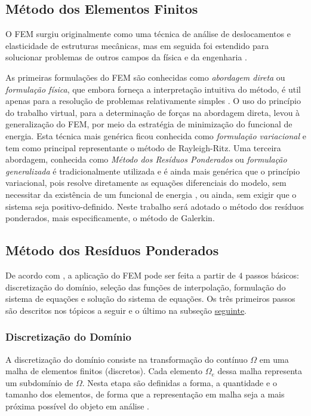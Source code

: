 \documentclass[
    12pt,               %
    openright,          %
    oneside,
    a4paper,            %
    english,            %
    french,             %
    spanish,            %
    brazil              %
    ]{abntex2}
\begin{document}
\subsection{Método dos Elementos Finitos}

O FEM surgiu originalmente como uma técnica de análise de deslocamentos e elasticidade de estruturas mecânicas, mas em seguida foi estendido para solucionar problemas de outros campos da física e da engenharia \cite{jin, desai, zien}.

As primeiras formulações do FEM são conhecidas como \textit{abordagem direta} ou \textit{formulação física}, que embora forneça a interpretação intuitiva do método, é util apenas para a resolução de problemas relativamente simples \cite{huebner, desai, zien}. O uso do princípio do trabalho virtual, para a determinação de forças na abordagem direta, levou à generalização do FEM, por meio da estratégia de minimização do funcional de energia. Esta técnica mais genérica  ficou conhecida como \textit{formulação variacional} \cite{desai, zien, jin} e tem como principal representante o método de Rayleigh-Ritz. Uma terceira abordagem, conhecida como \textit{Método dos Resíduos Ponderados} ou \textit{formulação generalizada} \cite{zien, huebner} é tradicionalmente utilizada e é ainda mais genérica que o princípio variacional, pois resolve diretamente as equações diferenciais do modelo, sem necessitar da existência de um funcional de energia \cite{desai}, ou ainda, sem exigir que o sistema seja positivo-definido. Neste trabalho será adotado o método dos resíduos ponderados, mais especificamente, o método de Galerkin.


\subsection{Método dos Resíduos Ponderados}
\label{sec:proc}

De acordo com , a aplicação do FEM pode ser feita a partir de $4$ passos básicos: discretização do domínio, seleção das funções de interpolação, formulação do sistema de equações e solução do sistema de equações. Os três primeiros passos são descritos nos tópicos a seguir e o último na subseção \hyperref[sec:CG]{seguinte}.


\subsubsection*{Discretização do Domínio} 
A discretização do domínio consiste na transformação do contínuo $\Omega$ em uma malha de elementos finitos (discretos). Cada elemento $\Omega_e$ dessa malha representa um subdomínio de $\Omega$.  
Nesta etapa são definidas a forma, a quantidade e o tamanho dos elementos, de forma que a representação em malha seja a mais próxima possível do objeto em análise \cite{desai}.
\end{document}
